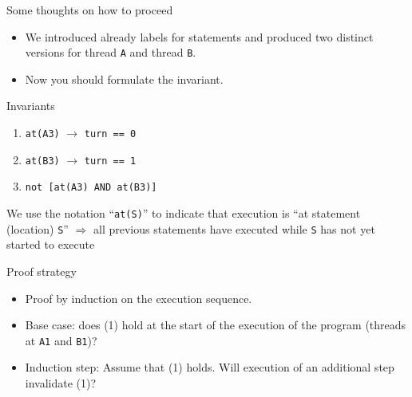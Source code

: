 \begin{frame}{Some thoughts on how to proceed}
  \begin{itemize}
  \item We introduced already labels for statements and produced two
    distinct versions for thread \lstinline!A! and thread
    \lstinline!B!.
  \item Now you should formulate the invariant.
  \end{itemize}  
\end{frame}

\begin{frame}[fragile]{Invariants}
  \begin{enumerate}
  \item \lstinline!at(A3)! $\rightarrow$ \lstinline!turn == 0!
  \item \lstinline!at(B3)! $\rightarrow$ \lstinline!turn == 1!
  \item \lstinline!not [at(A3) AND at(B3)]!
  \end{enumerate}


  We use the notation ``\lstinline!at(S)!'' to indicate that execution
  is ``at statement (location) \lstinline!S!'' $\Rightarrow$ all
  previous statements have executed while \lstinline!S! has not yet
  started to execute
\end{frame}

\begin{frame}{Proof strategy}
  \begin{itemize}
  \item Proof by induction on the execution sequence.
  \item Base case: does (1) hold at the start of the execution of the
    program (threads at \lstinline!A1! and \lstinline!B1!)?
 \item Induction step: Assume that (1) holds. Will execution of an
   additional step invalidate (1)?
  \end{itemize}
\end{frame}

